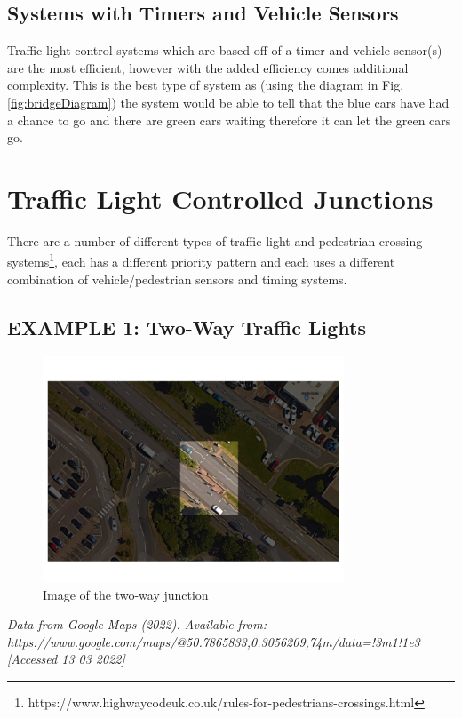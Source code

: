 \subsection{Systems with Timers and Vehicle Sensors}
Traffic light control systems which are based off of a timer and vehicle sensor(s) are the most efficient, however with the added efficiency comes additional complexity. This is the best type of system as (using the diagram in Fig. \ref{fig:bridgeDiagram}) the system would be able to tell that the blue cars have had a chance to go and there are green cars waiting therefore it can let the green cars go.


\section{Traffic Light Controlled Junctions}
There are a number of different types of traffic light and pedestrian crossing systems\footnote{https://www.highwaycodeuk.co.uk/rules-for-pedestrians-crossings.html}, each has a different priority pattern and each uses a different combination of vehicle/pedestrian sensors and timing systems.

\subsection{EXAMPLE 1: Two-Way Traffic Lights}
\begin{figure}[H]
    \centering
    \includegraphics[width=0.8\textwidth]{images/Simple TL junction outside tesco.png}
    \caption{Image of the two-way junction}
    \label{fig:tesoTrafficLights}
\end{figure}
\noindent \textit{Data from Google Maps (2022). Available from:\\ https://www.google.com/maps/@50.7865833,0.3056209,74m/data=!3m1!1e3 [Accessed 13 03 2022]}\newline


